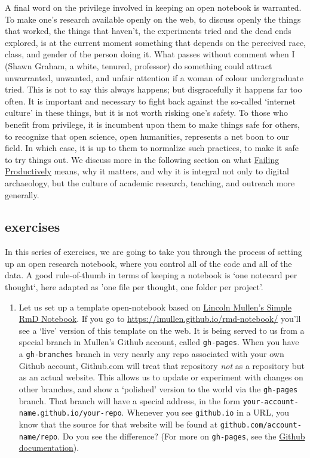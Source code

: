 \documentclass[english,]{book}
\providecommand{\tightlist}{%
  \setlength{\itemsep}{0pt}\setlength{\parskip}{0pt}}
\begin{document}
A final word on the privilege involved in keeping an open notebook is
warranted. To make one's research available openly on the web, to
discuss openly the things that worked, the things that haven't, the
experiments tried and the dead ends explored, is at the current moment
something that depends on the perceived race, class, and gender of the
person doing it. What passes without comment when I (Shawn Graham, a
white, tenured, professor) do something could attract unwarranted,
unwanted, and unfair attention if a woman of colour undergraduate tried.
This is not to say this always happens; but disgracefully it happens far
too often. It is important and necessary to fight back against the
so-called `internet culture' in these things, but it is not worth
risking one's safety. To those who benefit from privilege, it is
incumbent upon them to make things safe for others, to recognize that
open science, open humanities, represents a net boon to our field. In
which case, it is up to them to normalize such practices, to make it
safe to try things out. We discuss more in the following section on what
\protect\hyperlink{failing-productively}{Failing Productively} means,
why it matters, and why it is integral not only to digital archaeology,
but the culture of academic research, teaching, and outreach more
generally.

\subsection{exercises}\label{exercises-3}

In this series of exercises, we are going to take you through the
process of setting up an open research notebook, where you control all
of the code and all of the data. A good rule-of-thumb in terms of
keeping a notebook is `one notecard per thought`, here adapted as 'one
file per thought, one folder per project'.

\begin{enumerate}
\def\labelenumi{\arabic{enumi}.}
\tightlist
\item
  Let us set up a template open-notebook based on
  \href{https://github.com/lmullen/rmd-notebook}{Lincoln Mullen's Simple
  RmD Notebook}. If you go to
  \url{https://lmullen.github.io/rmd-notebook/} you'll see a `live'
  version of this template on the web. It is being served to us from a
  special branch in Mullen's Github account, called \texttt{gh-pages}.
  When you have a \texttt{gh-branches} branch in very nearly any repo
  associated with your own Github account, Github.com will treat that
  repository \emph{not} as a repository but as an actual website. This
  allows us to update or experiment with changes on other branches, and
  show a `polished' version to the world via the \texttt{gh-pages}
  branch. That branch will have a special address, in the form
  \texttt{your-account-name.github.io/your-repo}. Whenever you see
  \texttt{github.io} in a URL, you know that the source for that website
  will be found at \texttt{github.com/account-name/repo}. Do you see the
  difference? (For more on \texttt{gh-pages}, see the
  \href{https://pages.github.com/}{Github documentation}).
\end{enumerate}
\end{document}
